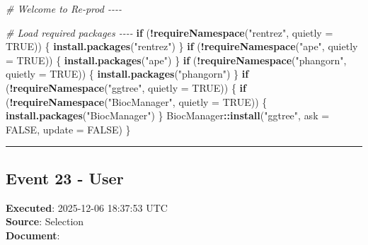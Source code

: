 \documentclass[
  11pt,
]{article}
\newenvironment{Shaded}{\begin{snugshade}}{\end{snugshade}}
\newcommand{\AttributeTok}[1]{\textcolor[rgb]{0.13,0.29,0.53}{#1}}
\newcommand{\CommentTok}[1]{\textcolor[rgb]{0.56,0.35,0.01}{\textit{#1}}}
\newcommand{\ConstantTok}[1]{\textcolor[rgb]{0.56,0.35,0.01}{#1}}
\newcommand{\ControlFlowTok}[1]{\textcolor[rgb]{0.13,0.29,0.53}{\textbf{#1}}}
\newcommand{\FunctionTok}[1]{\textcolor[rgb]{0.13,0.29,0.53}{\textbf{#1}}}
\newcommand{\NormalTok}[1]{#1}
\newcommand{\SpecialCharTok}[1]{\textcolor[rgb]{0.81,0.36,0.00}{\textbf{#1}}}
\newcommand{\StringTok}[1]{\textcolor[rgb]{0.31,0.60,0.02}{#1}}
\begin{document}
\begin{Shaded}
\begin{Highlighting}[]
\CommentTok{\# Welcome to Re{-}prod {-}{-}{-}{-}}

\CommentTok{\# Load required packages {-}{-}{-}{-}}
\ControlFlowTok{if}\NormalTok{ (}\SpecialCharTok{!}\FunctionTok{requireNamespace}\NormalTok{(}\StringTok{"rentrez"}\NormalTok{, }\AttributeTok{quietly =} \ConstantTok{TRUE}\NormalTok{)) \{}
  \FunctionTok{install.packages}\NormalTok{(}\StringTok{"rentrez"}\NormalTok{)}
\NormalTok{\}}
\ControlFlowTok{if}\NormalTok{ (}\SpecialCharTok{!}\FunctionTok{requireNamespace}\NormalTok{(}\StringTok{"ape"}\NormalTok{, }\AttributeTok{quietly =} \ConstantTok{TRUE}\NormalTok{)) \{}
  \FunctionTok{install.packages}\NormalTok{(}\StringTok{"ape"}\NormalTok{)}
\NormalTok{\}}
\ControlFlowTok{if}\NormalTok{ (}\SpecialCharTok{!}\FunctionTok{requireNamespace}\NormalTok{(}\StringTok{"phangorn"}\NormalTok{, }\AttributeTok{quietly =} \ConstantTok{TRUE}\NormalTok{)) \{}
  \FunctionTok{install.packages}\NormalTok{(}\StringTok{"phangorn"}\NormalTok{)}
\NormalTok{\}}
\ControlFlowTok{if}\NormalTok{ (}\SpecialCharTok{!}\FunctionTok{requireNamespace}\NormalTok{(}\StringTok{"ggtree"}\NormalTok{, }\AttributeTok{quietly =} \ConstantTok{TRUE}\NormalTok{)) \{}
  \ControlFlowTok{if}\NormalTok{ (}\SpecialCharTok{!}\FunctionTok{requireNamespace}\NormalTok{(}\StringTok{"BiocManager"}\NormalTok{, }\AttributeTok{quietly =} \ConstantTok{TRUE}\NormalTok{)) \{}
    \FunctionTok{install.packages}\NormalTok{(}\StringTok{"BiocManager"}\NormalTok{)}
\NormalTok{  \}}
\NormalTok{  BiocManager}\SpecialCharTok{::}\FunctionTok{install}\NormalTok{(}\StringTok{"ggtree"}\NormalTok{, }\AttributeTok{ask =} \ConstantTok{FALSE}\NormalTok{, }\AttributeTok{update =} \ConstantTok{FALSE}\NormalTok{)}
\NormalTok{\}}
\end{Highlighting}
\end{Shaded}

\begin{center}\rule{0.5\linewidth}{0.5pt}\end{center}

\subsection{Event 23 - User}\label{event-23---user}

\textbf{Executed}: 2025-12-06 18:37:53 UTC\\
\textbf{Source}: Selection\\
\textbf{Document}:
\end{document}
